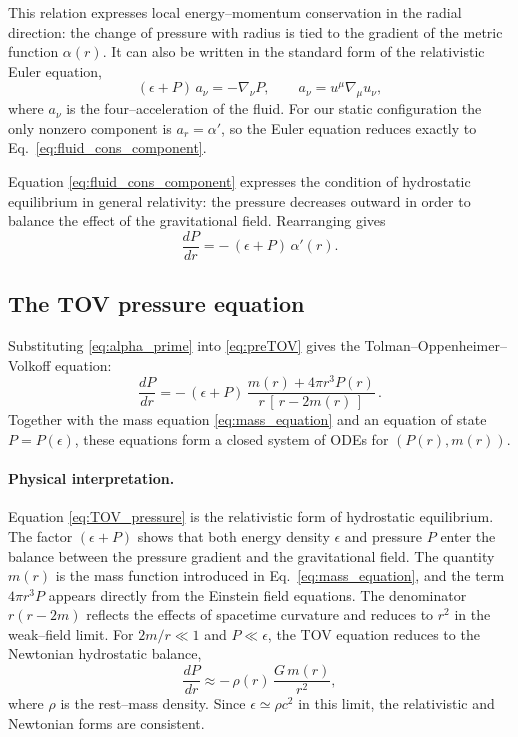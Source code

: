 This relation expresses local energy–momentum conservation in the radial direction: 
the change of pressure with radius is tied to the gradient of the metric function $\alpha(r)$. 
It can also be written in the standard form of the relativistic Euler equation,
\begin{equation}
(\epsilon+P)\,a_{\nu}=-\nabla_{\nu}P,\qquad 
a_{\nu}=u^{\mu}\nabla_{\mu}u_{\nu},
\end{equation}
where $a_{\nu}$ is the four–acceleration of the fluid. 
For our static configuration the only nonzero component is $a_{r}=\alpha'$, 
so the Euler equation reduces exactly to Eq.~\eqref{eq:fluid_cons_component}.

Equation \eqref{eq:fluid_cons_component} expresses the condition of hydrostatic 
equilibrium in general relativity: the pressure decreases outward in order to 
balance the effect of the gravitational field. 
Rearranging gives
\begin{equation}
\frac{dP}{dr}=-\,(\epsilon+P)\,\alpha'(r).
\label{eq:preTOV}
\end{equation}

\subsection*{The TOV pressure equation}

Substituting \eqref{eq:alpha_prime} into \eqref{eq:preTOV} gives the Tolman--Oppenheimer--Volkoff equation:
\begin{equation}
\boxed{\;
\frac{dP}{dr}
= -\,(\epsilon+P)\,\frac{m(r)+4\pi r^{3}P(r)}{r\,[\,r-2m(r)\,]}\,.
\;}
\label{eq:TOV_pressure}
\end{equation}
Together with the mass equation \eqref{eq:mass_equation} 
and an equation of state $P=P(\epsilon)$, these equations form a closed system of ODEs
for $(P(r),m(r))$.

\paragraph{Physical interpretation.}
Equation \eqref{eq:TOV_pressure} is the relativistic form of hydrostatic equilibrium.  
The factor $(\epsilon+P)$ shows that both energy density $\epsilon$ and pressure $P$ enter the balance 
between the pressure gradient and the gravitational field.  
The quantity $m(r)$ is the mass function introduced in Eq.~\eqref{eq:mass_equation}, and the term 
$4\pi r^{3}P$ appears directly from the Einstein field equations.  
The denominator $r(r-2m)$ reflects the effects of spacetime curvature and reduces to $r^{2}$ in the 
weak–field limit.  
For $2m/r \ll 1$ and $P \ll \epsilon$, the TOV equation reduces to the Newtonian hydrostatic balance,
\begin{equation}
\frac{dP}{dr}\approx -\,\rho(r)\,\frac{G\,m(r)}{r^{2}},
\end{equation}
where $\rho$ is the rest–mass density.  
Since $\epsilon\simeq \rho c^{2}$ in this limit, the relativistic and Newtonian forms are consistent.  

